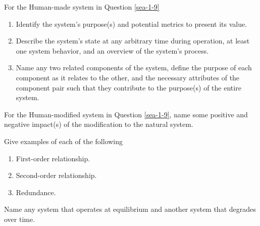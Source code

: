 \begin{exercises}
    \begin{exercise} 
    \label{sea-1-10_11_12}
        For the Human-made system in Question \ref{sea-1-9}
        \begin{enumerate}[label=\alph*)]
            \item Identify the system's purpose(s) and potential metrics to present its value.
            \item Describe the system's state at any arbitrary time during operation, at least one system behavior, and an overview of the system's process.
            \item Name any two related components of the system, define the purpose of each component as it relates to the other, and the necessary attributes of the component pair such that they contribute to the purpose(s) of the entire system.
        \end{enumerate}
    \end{exercise}
    \begin{solution}
    \end{solution}
    
    \begin{exercise} 
    \label{sea-1-14}
        For the Human-modified system in Question \ref{sea-1-9}, name some positive and negative impact(s) of the modification to the natural system.
    \end{exercise}
    \begin{solution}
    \end{solution}
    
    \begin{exercise} 
    \label{sea-1-13}
        Give examples of each of the following
        \begin{enumerate}[label=\alph*)]
            \item First-order relationship.
            \item Second-order relationship.
            \item Redundance.
        \end{enumerate}
    \end{exercise}
    \begin{solution}
    \end{solution}
    
    \begin{exercise} 
    \label{sea-1-16}
        Name any system that operates at equilibrium and another system that degrades over time.
    \end{exercise}
    \begin{solution}
    \end{solution}
    

\end{exercises}
